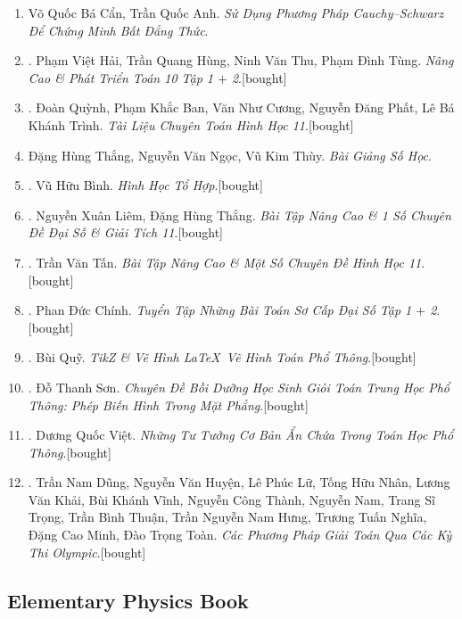 \documentclass{article}
\begin{document}
\begin{enumerate}
	\item Võ Quốc Bá Cẩn, Trần Quốc Anh. \textit{Sử Dụng Phương Pháp Cauchy--Schwarz Để Chứng Minh Bất Đẳng Thức}.
	\item \cite{Hai_Hung_Thu_Tung2022_tap_1, Hai_Hung_Thu_Tung2022_tap_2}. Phạm Việt Hải, Trần Quang Hùng, Ninh Văn Thu, Phạm Đình Tùng. \textit{Nâng Cao \& Phát Triển Toán 10 Tập 1 $+$ 2}.\hfill\textsf{[bought]}
	\item \cite{TL_chuyen_Toan_Hinh_Hoc_11}. Đoàn Quỳnh, Phạm Khắc Ban, Văn Như Cương, Nguyễn Đăng Phất, Lê Bá Khánh Trình. \textit{Tài Liệu Chuyên Toán Hình Học 11}.\hfill\textsf{[bought]}
	\item Đặng Hùng Thắng, Nguyễn Văn Ngọc, Vũ Kim Thùy. \textit{Bài Giảng Số Học}.
	\item \cite{Binh_HHTH}. Vũ Hữu Bình. \textit{Hình Học Tổ Hợp}.\hfill\textsf{[bought]}
	\item \cite{Liem_Thang2020}. Nguyễn Xuân Liêm, Đặng Hùng Thắng. \textit{Bài Tập Nâng Cao \& 1 Số Chuyên Đề Đại Số \& Giải Tích 11}.\hfill\textsf{[bought]}
	\item \cite{Tan2017}. Trần Văn Tấn. \textit{Bài Tập Nâng Cao \& Một Số Chuyên Đề Hình Học 11}.\hfill\textsf{[bought]}
	\item \cite{Chinh2021_tap_1, Chinh2021_tap_2}. Phan Đức Chính. \textit{Tuyển Tập Những Bài Toán Sơ Cấp Đại Số Tập 1 $+$ 2}.\hfill\textsf{[bought]}
	\item \cite{Quy2022}. Bùi Quỹ. \textit{TikZ \& Vẽ Hình \LaTeX\ Vẽ Hình Toán Phổ Thông}.\hfill\textsf{[bought]}
	\item \cite{Son2006}. Đỗ Thanh Sơn. \textit{Chuyên Đề Bồi Dưỡng Học Sinh Giỏi Toán Trung Học Phổ Thông: Phép Biến Hình Trong Mặt Phẳng}.\hfill\textsf{[bought]}
	\item \cite{Viet2014}. Dương Quốc Việt. \textit{Những Tư Tưởng Cơ Bản Ẩn Chứa Trong Toán Học Phổ Thông}.\hfill\textsf{[bought]}
	\item \cite{Dung_cac_phuong_phap_giai_toan_qua_cac_ky_thi_olympic_2022}. Trần Nam Dũng, Nguyễn Văn Huyện, Lê Phúc Lữ, Tống Hữu Nhân, Lương Văn Khải, Bùi Khánh Vĩnh, Nguyễn Công Thành, Nguyễn Nam, Trang Sĩ Trọng, Trần Bình Thuận, Trần Nguyễn Nam Hưng, Trương Tuấn Nghĩa, Đặng Cao Minh, Đào Trọng Toàn. \textit{Các Phương Pháp Giải Toán Qua Các Kỳ Thi Olympic}.\hfill\textsf{[bought]}
\end{enumerate}

\subsection{Elementary Physics Book}
\end{document}
